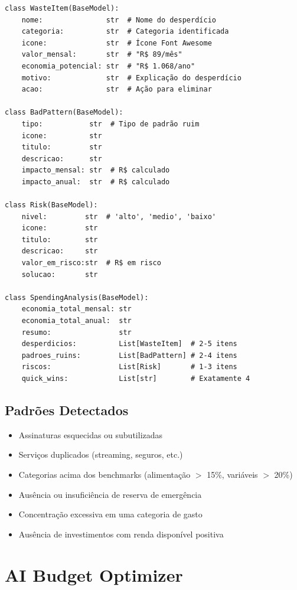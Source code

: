 \documentclass[12pt, a4paper, oneside]{report}
\begin{document}
\begin{lstlisting}[style=python, caption={finance/spending\_analyzer.py — Modelos Pydantic}]
class WasteItem(BaseModel):
    nome:               str  # Nome do desperdício
    categoria:          str  # Categoria identificada
    icone:              str  # Ícone Font Awesome
    valor_mensal:       str  # "R$ 89/mês"
    economia_potencial: str  # "R$ 1.068/ano"
    motivo:             str  # Explicação do desperdício
    acao:               str  # Ação para eliminar

class BadPattern(BaseModel):
    tipo:           str  # Tipo de padrão ruim
    icone:          str
    titulo:         str
    descricao:      str
    impacto_mensal: str  # R$ calculado
    impacto_anual:  str  # R$ calculado

class Risk(BaseModel):
    nivel:         str  # 'alto', 'medio', 'baixo'
    icone:         str
    titulo:        str
    descricao:     str
    valor_em_risco:str  # R$ em risco
    solucao:       str

class SpendingAnalysis(BaseModel):
    economia_total_mensal: str
    economia_total_anual:  str
    resumo:                str
    desperdicios:          List[WasteItem]  # 2-5 itens
    padroes_ruins:         List[BadPattern] # 2-4 itens
    riscos:                List[Risk]       # 1-3 itens
    quick_wins:            List[str]        # Exatamente 4
\end{lstlisting}

\subsection{Padrões Detectados}

\begin{itemize}
  \item Assinaturas esquecidas ou subutilizadas
  \item Serviços duplicados (streaming, seguros, etc.)
  \item Categorias acima dos benchmarks (alimentação $>$ 15\%, variáveis $>$ 20\%)
  \item Ausência ou insuficiência de reserva de emergência
  \item Concentração excessiva em uma categoria de gasto
  \item Ausência de investimentos com renda disponível positiva
\end{itemize}

\section{AI Budget Optimizer}
\end{document}
